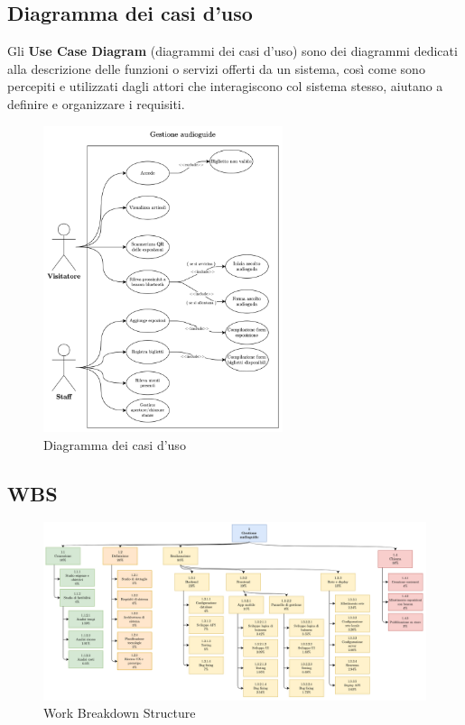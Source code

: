 \documentclass[12pt]{article}
\begin{document}
\clearpage

\subsection{Diagramma dei casi d'uso}
Gli \textbf{Use Case Diagram} (diagrammi dei casi d'uso) sono dei diagrammi dedicati alla descrizione delle funzioni o servizi offerti da un sistema, così come sono percepiti e utilizzati dagli attori che interagiscono col sistema stesso, aiutano a definire e organizzare i requisiti.
\begin{center}
    \begin{figure}[htp]
        \centering
        \includegraphics[width=7cm]{diagrams/usecase_diagrams.png}
        \caption{Diagramma dei casi d'uso}
        \label{fig:usecase}
    \end{figure}
\end{center}

\subsection{WBS}
\begin{center}
    \begin{figure}[htp]
        \centering
        \includegraphics[width=14cm]{diagrams/elaborato_wbs_v2-wbs_V2_rev.png}
        \caption{Work Breakdown Structure}
        \label{fig:wbs}
    \end{figure}
\end{center}
\clearpage
\end{document}
